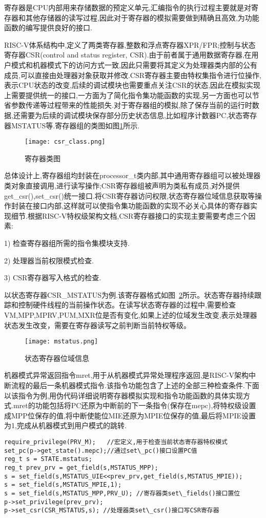 寄存器是CPU内部用来存储数据的预定义单元,汇编指令的执行过程主要就是对寄存器和其他存储器的读写过程,因此对于寄存器的模拟需要做到精确且高效,为功能函数的编写提供良好的接口.


RISC-V体系结构中,定义了两类寄存器,整数和浮点寄存器XPR/FPR;控制与状态寄存器CSR(control and status register, CSR).由于前者属于通用数据寄存器,在用户模式和机器模式下的访问方式一致,因此只需要将其定义为处理器类内部的公有成员,可以直接由处理器对象获取并修改.CSR寄存器主要由特权集指令进行位操作,表示CPU状态的改变,后续的调试模块也需要重点关注CSR的状态,因此在模拟实现上需要提供统一的接口,一方面为了简化指令集功能函数的实现,另一方面也可以节省参数传递等过程带来的性能损失.对于寄存器组的模拟,除了保存当前的运行时数据,还需要为后续的调试模块保存部分历史状态信息,比如程序计数器PC,状态寄存器MSTATUS等.寄存器组的类图如图\ref{fig:csr_class}所示.
\begin{figure}[h]
    \centering
    \texttt{[image: csr\_class.png]}
    \caption{寄存器类图}
    \label{fig:csr_class}
\end{figure}

总体设计上,寄存器组均封装在processor\_t类内部,其中通用寄存器组可以被处理器类对象直接调用,进行读写操作;CSR寄存器组被声明为类私有成员,对外提供get\_csr(),set\_csr()统一接口.将CSR寄存器访问权限,状态寄存器位域信息获取等操作封装在接口内部,这样就可以使指令集功能函数的实现不必关心具体的寄存器实现细节.根据RISC-V特权级架构文档,CSR寄存器接口的实现主要需要考虑三个因素:


1) 检查寄存器组所需的指令集模块支持.


2) 处理器当前权限模式检查.


3) CSR寄存器写入格式的检查.


以状态寄存器CSR\_MSTATUS为例.该寄存器格式如图~\ref{fig:mstatus}所示。状态寄存器持续跟踪和控制硬件线程的当前操作状态。在读写状态寄存器的过程中,需要检查VM,MPP,MPRV,PUM,MXR位是否有变化,如果上述的位域发生改变,表示处理器状态发生改变，需要在寄存器读写之前判断当前特权等级。
\begin{figure}[H]
    \centering
    \texttt{[image: mstatus.png]}
    \caption{状态寄存器位域信息}
    \label{fig:mstatus}
\end{figure}


机器模式异常返回指令mret,用于从机器模式异常处理程序返回,是RISC-V架构中断流程的最后一条机器模式指令.该指令功能包含了上述的全部三种检查条件.下面以该指令为例,用伪代码详细说明寄存器模拟实现和指令功能函数的具体实现方式.mret的功能包括将PC还原为中断前的下一条指令(保存在mepc),将特权级设置成MPP位保存的值,将中断使能位MIE还原为MPIE位保存的值,最后将MPIE设置为1,完成从机器模式到用户模式的跳转.
\begin{lstlisting}
require_privilege(PRV_M);   //宏定义,用于检查当前状态寄存器特权模式
set_pc(p->get_state().mepc);//通过set\_pc()接口设置PC值
reg_t s = STATE.mstatus;    
reg_t prev_prv = get_field(s,MSTATUS_MPP);
s = set_field(s,MSTATUS_UIE<<prev_prv,get_field(s,MSTATUS_MPIE));
s = set_field(s,MSTATUS_MPIE,1); 
s = set_field(s,MSTATUS_MPP,PRV_U); //寄存器类set\_fields()接口置位
p->set_privilege(prev_prv);
p->set_csr(CSR_MSTATUS,s); //处理器类set\_csr()接口写CSR寄存器
\end{lstlisting}

